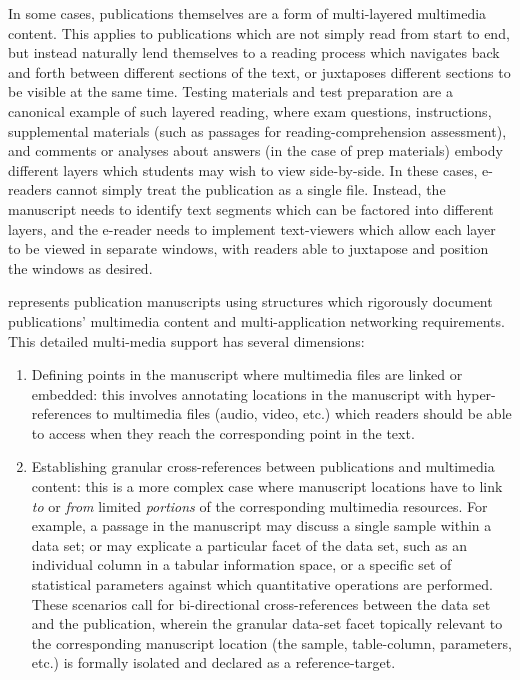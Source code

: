 \documentclass[10pt,letterpaper]{article}
\newcommand{\HTXN}{\resizebox{!}{8pt}{\AcronymText{HTXN}}}
\newcommand{\lHTXN}{\resizebox{!}{8.5pt}{\AcronymText{HTXN}}}
\newcommand{\textscc}[1]{{\color{orr!35!black}{{%
						\fontfamily{Cabin-TLF}\fontseries{b}\selectfont{\textsc{\scriptsize{#1}}}}}}}
\newcommand{\AcronymText}[1]{{\textscc{#1}}}
\newcommand{\p}[1]{

\vspace{1em}#1}
\newcommand{\inditem}{\itemindent10pt\item}
\newcommand{\mnote}[1]{%
\vspace*{-2em}
\reversemarginpar
\raisebox{1em}{\marginnote{\parbox{4em}{%
\begin{mdframed}[innerleftmargin=4pt,
	innerrightmargin=1pt,innertopmargin=1pt,
	linecolor=red!20!cyan,userdefinedwidth=4em,
	topline=false,
	rightline=false]
{{\fontfamily{ppl}\fontsize{12}{0}\selectfont
		\textit{#1}}}
\end{mdframed}}
	}[3em]}}
\begin{document}
{{\begin{description}[leftmargin=2pt,
	labelindent=-2pt,labelsep=12pt]
\item[Publications-as-Applications]  In some 
cases, publications themselves are a form of 
multi-layered multimedia content.  This applies 
to publications which are not simply read from 
start to end, but instead naturally lend 
themselves to a reading process which navigates 
back and forth between different sections of 
the text, or juxtaposes different sections to be 
visible at the same time.  Testing materials 
and test preparation are a canonical example 
of such layered reading, where exam questions, 
instructions, supplemental materials (such 
as passages for reading-comprehension 
assessment), and comments or analyses about 
answers (in the case of prep materials) 
embody different layers which 
students may wish to view side-by-side.  
In these cases, e-readers cannot simply 
treat the publication as a single file.  
Instead, the manuscript needs 
to identify text segments which can be factored 
into different layers, and the e-reader 
needs to implement text-viewers which allow 
each layer to be viewed in separate windows, 
with readers able to juxtapose and position the 
windows as desired. 
\end{description}\vspace{-2em}
}


\p{\lHTXN{} represents publication manuscripts 
using structures which rigorously document 
publications' multimedia content and multi-application 
networking requirements.  This detailed 
multi-media support has several dimensions: 

\begin{enumerate}[leftmargin=2pt]
\inditem{} Defining points in the manuscript where 
multimedia files are linked or embedded: this 
involves annotating locations in the manuscript 
with hyper-references to multimedia files 
(audio, video, etc.) which readers should be 
able to access when they reach the corresponding 
point in the text.

\mnote{\HTXN{} cross-references to data-\\sets}
\inditem{} Establishing granular cross-references between 
publications and multimedia content: this is a 
more complex case where manuscript locations have to 
link \textit{to} or \textit{from} limited 
\textit{portions} of the corresponding multimedia 
resources.  For example, a passage in the manuscript 
may discuss a single sample within a data set; or 
may explicate a particular facet of the data set, 
such as an individual column in a tabular 
information space, or a specific set of 
statistical parameters against which quantitative 
operations are performed.  These scenarios 
call for bi-directional cross-references between the 
data set and the publication, wherein the granular 
data-set facet topically relevant to the 
corresponding manuscript location (the sample, 
table-column, parameters, etc.) is formally 
isolated and declared as a reference-target.  


\end{enumerate}}}
\end{document}
